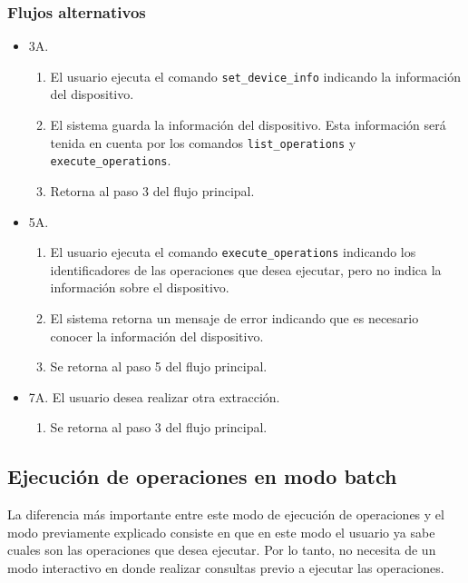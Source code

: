 \subsubsection*{Flujos alternativos}

\begin{itemize}
\item 3A.
    \begin{enumerate}
    \item El usuario ejecuta el comando \texttt{set\_device\_info} indicando la información del dispositivo.
    \item El sistema guarda la información del dispositivo. Esta información será tenida en cuenta por los comandos \texttt{list\_operations} y \texttt{execute\_operations}.
    \item Retorna al paso 3 del flujo principal.
    \end{enumerate}
\end{itemize}

\begin{itemize}
\item 5A.
    \begin{enumerate}
    \item El usuario ejecuta el comando \texttt{execute\_operations} indicando los identificadores de las operaciones que desea ejecutar, pero no indica la información sobre el dispositivo.
    \item El sistema retorna un mensaje de error indicando que es necesario conocer la información del dispositivo.
    \item Se retorna al paso 5 del flujo principal.
    \end{enumerate}
\end{itemize}

\begin{itemize}
\item 7A. El usuario desea realizar otra extracción.
    \begin{enumerate}
    \item Se retorna al paso 3 del flujo principal.
    \end{enumerate}
\end{itemize}

\subsection{Ejecución de operaciones en modo batch}
La diferencia más importante entre este modo de ejecución de operaciones y el modo previamente explicado consiste en que en este modo el usuario ya sabe cuales son las operaciones que desea ejecutar. Por lo tanto, no necesita de un modo interactivo en donde realizar consultas previo a ejecutar las operaciones.

